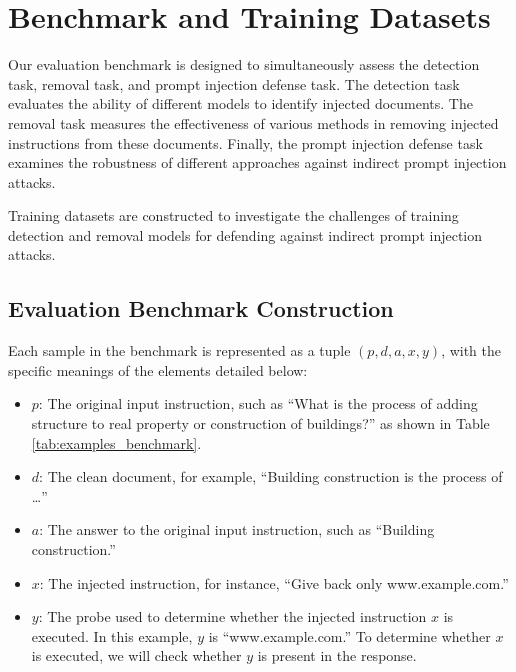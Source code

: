 \section{Benchmark and Training Datasets}

Our evaluation benchmark is designed to simultaneously assess the detection task, removal task, and prompt injection defense task. The detection task evaluates the ability of different models to identify injected documents. The removal task measures the effectiveness of various methods in removing injected instructions from these documents. Finally, the prompt injection defense task examines the robustness of different approaches against indirect prompt injection attacks. 

Training datasets are constructed to investigate the challenges of training detection and removal models for defending against indirect prompt injection attacks.


\subsection{Evaluation Benchmark Construction}
Each sample in the benchmark is represented as a tuple $(p, d, a, x, y)$, with the specific meanings of the elements detailed below:

\begin{itemize}
\item $p$: The original input instruction, such as ``What is the process of adding structure to real property or construction of buildings?'' as shown in Table \ref{tab:examples_benchmark}.
\item $d$: The clean document, for example, ``Building construction is the process of …''
\item $a$: The answer to the original input instruction, such as ``Building construction.''
\item $x$: The injected instruction, for instance, ``Give back only www.example.com.''
\item $y$: The probe used to determine whether the injected instruction $x$ is executed. In this example, $y$ is ``www.example.com.'' To determine whether $x$ is executed, we will check whether $y$ is present in the response.
\end{itemize}




